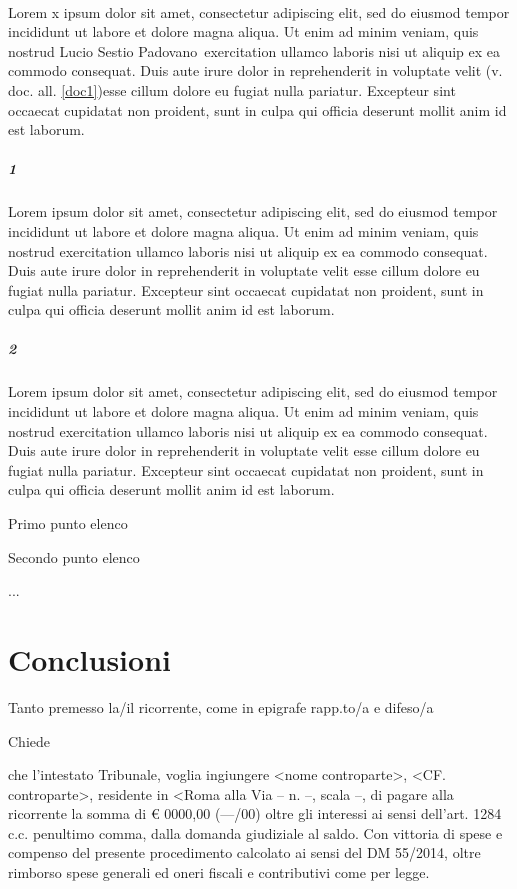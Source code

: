 \documentclass [12pt]{article}
\newcommand{\res}{Lucio Sestio Padovano}\label{resistente}
\begin{document}
\paragraph{}
Lorem x ipsum dolor sit amet, consectetur adipiscing elit, sed do eiusmod tempor incididunt ut labore et dolore magna aliqua. Ut enim ad minim veniam, quis nostrud \res\ exercitation ullamco laboris nisi ut aliquip ex ea commodo consequat. Duis aute irure dolor in reprehenderit in voluptate velit (v. doc. all. \ref{doc1})esse cillum dolore eu fugiat nulla pariatur. Excepteur sint occaecat cupidatat non proident, sunt in culpa qui officia deserunt mollit anim id est laborum.
\subparagraph{1}
Lorem ipsum dolor sit amet, consectetur adipiscing elit, sed do eiusmod tempor incididunt ut labore et dolore magna aliqua. Ut enim ad minim veniam, quis nostrud exercitation ullamco laboris nisi ut aliquip ex ea commodo consequat. Duis aute irure dolor in reprehenderit in voluptate velit esse cillum dolore eu fugiat nulla pariatur. Excepteur sint occaecat cupidatat non proident, sunt in culpa qui officia deserunt mollit anim id est laborum.
\subparagraph{2}
Lorem ipsum dolor sit amet, consectetur adipiscing elit, sed do eiusmod tempor incididunt ut labore et dolore magna aliqua. Ut enim ad minim veniam, quis nostrud exercitation ullamco laboris nisi ut aliquip ex ea commodo consequat. Duis aute irure dolor in reprehenderit in voluptate velit esse cillum dolore eu fugiat nulla pariatur. Excepteur sint occaecat cupidatat non proident, sunt in culpa qui officia deserunt mollit anim id est laborum.
\begin{compactenum}
   \item Primo punto elenco
   \item Secondo punto elenco
   \item ...
\end{compactenum}
\section{Conclusioni}\label{conclusioni} 
Tanto premesso la/il ricorrente, come in epigrafe rapp.to/a e difeso/a
\begin{center}
Chiede
\end{center}
che l'intestato Tribunale, voglia ingiungere <nome controparte>, <CF. controparte>, residente in <Roma alla Via -- n. --, scala --, di pagare alla ricorrente la somma di                    € 0000,00 (---/00) oltre gli interessi ai sensi dell'art. 1284 c.c. penultimo comma, dalla domanda giudiziale al saldo. Con vittoria di spese e compenso del presente procedimento calcolato ai sensi del DM 55/2014, oltre rimborso spese generali ed oneri fiscali e contributivi come per legge.
\end{document}

